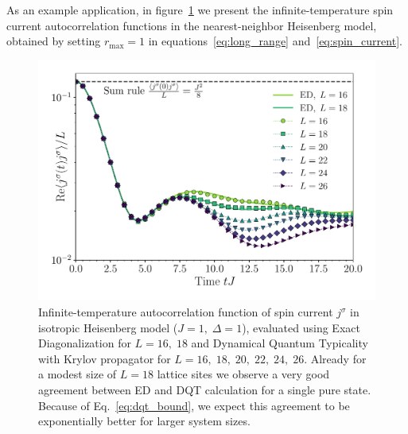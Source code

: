 As an example application, in figure~\ref{fig:spin_autocorr} we present the infinite-temperature spin current autocorrelation functions
in the nearest-neighbor Heisenberg model, obtained by setting \(r_{\mathrm{max}}=1\) in equations~\eqref{eq:long_range} and~\eqref{eq:spin_current}.
\begin{figure}[htbp]
	\centering
	\includegraphics[width=\textwidth]{Figures/autocorr_spin_current.pdf}
	\caption{Infinite-temperature autocorrelation function of spin current \(j^{\sigma}\) in isotropic Heisenberg model
		(\(J=1,\;\Delta=1\)), evaluated
		using Exact Diagonalization for \(L=16,\;18\) and Dynamical Quantum Typicality with Krylov propagator
		for \(L=16,\;18,\;20,\;22,\;24,\;26\). Already for a modest size of \(L=18\) lattice sites we observe
		a very good agreement between ED and DQT calculation for a single pure state. Because of Eq.~\eqref{eq:dqt_bound},
		we expect this agreement to be exponentially better for larger system sizes.}
	\label{fig:spin_autocorr}
\end{figure}


